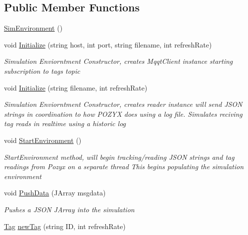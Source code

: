 \subsection*{Public Member Functions}
\begin{DoxyCompactItemize}
\item 
\hyperlink{class_pozyx_subscriber_1_1_sim_environment_a3b5bc1fd7dd731dd19e3441c1ab0b54b}{Sim\+Environment} ()
\item 
void \hyperlink{class_pozyx_subscriber_1_1_sim_environment_a84c5b43571ebc24a983d38f8cfa219bf}{Initialize} (string host, int port, string filename, int refresh\+Rate)
\begin{DoxyCompactList}\small\item\em Simulation Enviorntment Constructor, creates Mqqt\+Client instance starting subscription to tags topic \end{DoxyCompactList}\item 
void \hyperlink{class_pozyx_subscriber_1_1_sim_environment_acfe443c048085a6f9873e87b43f0b6eb}{Initialize} (string filename, int refresh\+Rate)
\begin{DoxyCompactList}\small\item\em Simulation Enviorntment Constructor, creates reader instance will send J\+S\+ON strings in coordination to how P\+O\+Z\+YX does using a log file. Simulates reciving tag reads in realtime using a historic log \end{DoxyCompactList}\item 
void \hyperlink{class_pozyx_subscriber_1_1_sim_environment_a1804d91547ecc65c02091d63e8c1163e}{Start\+Environment} ()
\begin{DoxyCompactList}\small\item\em Start\+Environment method, will begin tracking/reading J\+S\+ON strings and tag readings from Pozyx on a separate thread This begins populating the simulation environment \end{DoxyCompactList}\item 
void \hyperlink{class_pozyx_subscriber_1_1_sim_environment_abd4106d662f4991da45aa743b24c4d88}{Push\+Data} (J\+Array msgdata)
\begin{DoxyCompactList}\small\item\em Pushes a J\+S\+ON J\+Array into the simulation \end{DoxyCompactList}\item 
\hyperlink{class_pozyx_subscriber_1_1_framework_1_1_tag}{Tag} \hyperlink{class_pozyx_subscriber_1_1_sim_environment_af4ddb163b4b711c2c1105c7fc0253af9}{new\+Tag} (string ID, int refresh\+Rate)

\end{DoxyCompactItemize}
